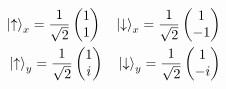 

\vspace*{\fill}
\centering

\begin{align*}
    \ket{\uparrow}_{x} = \frac{1}{\sqrt{2}} \begin{pmatrix} 1 \\ 1 \end{pmatrix}
   \quad 
    \ket{\downarrow}_{x} = \frac{1}{\sqrt{2}} \begin{pmatrix} 1 \\ -1 \end{pmatrix} 
    \\
    \ket{\uparrow}_{y} = \frac{1}{\sqrt{2}} \begin{pmatrix} 1 \\ i \end{pmatrix}
   \quad 
    \ket{\downarrow}_{y} = \frac{1}{\sqrt{2}} \begin{pmatrix} 1 \\ -i \end{pmatrix}
\end{align*}

\centering
\vspace*{\fill}

